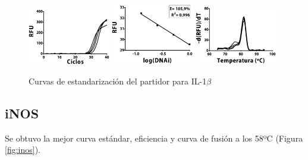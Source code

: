 \documentclass[12pt,letterpaper,oneside]{scrbook}
\begin{document}
\begin{figure}[h!]
\centering
        {\includegraphics[width=0.32\textwidth]{standarization/il1b/ampl}}
        {\includegraphics[width=0.32\textwidth]{standarization/il1b/stand}}
        {\includegraphics[width=0.32\textwidth]{standarization/il1b/melting}}
        \caption{Curvas de estandarización del partidor para IL-1$\beta$}
    \label {fig:il1b}
\end{figure}

\subsection{iNOS}

Se obtuvo la mejor curva estándar, eficiencia y curva de fusión a los
58ºC (Figura \ref{fig:inos}).
\end{document}
